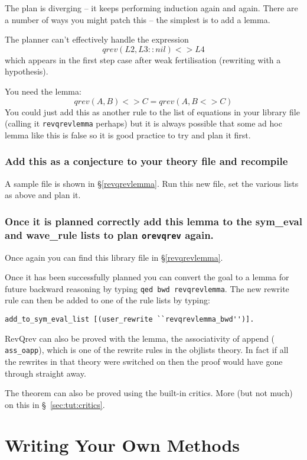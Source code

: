 The plan is diverging -- it keeps performing induction again and
again.  There are a number of ways you might patch this -- the
simplest is to add a
lemma.  

The planner can't effectively handle the expression 
$$qrev(L2, L3::nil) <> L4$$
which appears in the first step case after weak fertilisation
(rewriting with a hypothesis).

You need the lemma:
$$qrev(A, B) <> C = qrev(A, B <> C)$$
You could just add this as another rule to the list of equations in
your library file (calling it {\tt revqrevlemma} perhaps) but it is
always possible that some ad hoc lemma like this is false so it is
good practice to try and plan it first.

\subsubsection*{Add this as a conjecture to your theory file and recompile}
A sample file is shown in
\S\ref{revqrevlemma}.  
Run this new file, set the various lists as above and plan it.

\subsubsection*{Once it is planned correctly add
this lemma to the sym\_eval and wave\_rule lists to plan
{\tt orevqrev} again.}
Once again you can find this library file in \S\ref{revqrevlemma}.

Once it has been successfully planned you can convert the goal to a
lemma for future backward reasoning by typing {\tt qed bwd
  revqrevlemma}.  The new rewrite rule can then be added to one of the
rule lists by typing:
\begin{verbatim}
add_to_sym_eval_list [(user_rewrite ``revqrevlemma_bwd'')].
\end{verbatim}

RevQrev can also be proved with the lemma, the associativity of
append ({\tt
  ass\_oapp}), which is one of the rewrite
rules in the objlists theory.  In fact if all the rewrites in that theory were switched
on then the proof would have gone through straight away.

The theorem can also be proved using the built-in critics.  More (but
not much) on
this in \S~\ref{sec:tut:critics}.

\section{Writing Your Own Methods}

